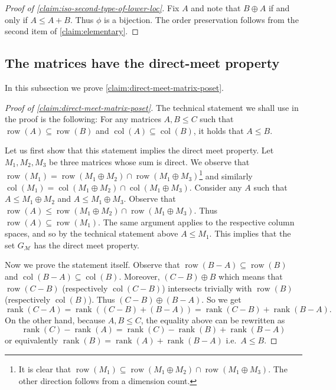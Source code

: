 \documentclass[10pt,a4paper]{article}
\newcommand{\prettyref}[1]{\cref{#1}}
\theoremstyle{definition}
\theoremstyle{remark}
\DeclareMathOperator{\rank}{rank}
\DeclareMathOperator{\row}{row}
\DeclareMathOperator{\col}{col}
\renewcommand{\leq}{\leqslant}
\numberwithin{equation}{section}
\let\pref=\prettyref
\def\MP{\mathcal{M}}
\begin{document}
\begin{proof}[Proof of \pref{claim:iso-second-type-of-lower-loc}]
    Fix \(A\) and note that \(B \oplus A\) if and only if \(A \leq A+B\). Thus \(\phi\) is a bijection. The order preservation follows from the second item of \pref{claim:elementary}.
\end{proof}

\subsection{The matrices have the direct-meet property} \label{app:direct-meet-matrices}
In this subsection we prove \pref{claim:direct-meet-matrix-poset}.
\begin{proof}[Proof of \pref{claim:direct-meet-matrix-poset}]
    The technical statement we shall use in the proof is the following: For any matrices \(A,B \leq C\) such that \(\row(A) \subseteq \row(B)\) and \(\col(A) \subseteq \col(B)\), it holds that \(A \leq B\).

    Let us first show that this statement implies the direct meet property. Let \(M_1,M_2,M_3\) be three matrices whose sum is direct. We observe that \(\row(M_1) = \row(M_1 \oplus M_2) \cap \row(M_1 \oplus M_3)\)\footnote{It is clear that \(\row(M_1) \subseteq  \row(M_1 \oplus M_2) \cap \row(M_1 \oplus M_3)\). The other direction follows from a dimension count.} and similarly \(\col(M_1) = \col(M_1 \oplus M_2) \cap \col(M_1 \oplus M_3)\). Consider any $A$ such that \(A \leq M_1 \oplus M_2\) and \(A \leq M_1 \oplus M_3\). Observe that \(\row(A) \leq \row(M_1 \oplus M_2) \cap \row(M_1 \oplus M_3)\). Thus \(\row(A) \subseteq \row(M_1)\). The same argument applies to the respective column spaces, and so by the technical statement above \(A \leq M_1\). This implies that the set \(G_{\MP}\) has the direct meet property.

    Now we prove the statement itself. Observe that \(\row(B-A) \subseteq \row(B)\) and \(\col(B-A) \subseteq \col(B)\). Moreover, \((C-B) \oplus B\) which means that \(\row(C-B)\) (respectively \(\col(C-B)\)) intersects trivially with \(\row(B)\) (respectively \(\col(B)\)). Thus \((C-B) \oplus (B-A)\). So we get
    \[ \rank(C-A) = \rank((C-B) + (B-A)) = \rank(C-B) + \rank(B-A).\]
    On the other hand, because \(A,B \leq C\), the equality above can be rewritten as
    \[\rank(C) - \rank(A) = \rank(C) - \rank(B) + \rank(B-A)\]
    or equivalently \(\rank(B) = \rank(A) + \rank(B-A)\) i.e.\ \(A \leq B\).
\end{proof}
\end{document}
